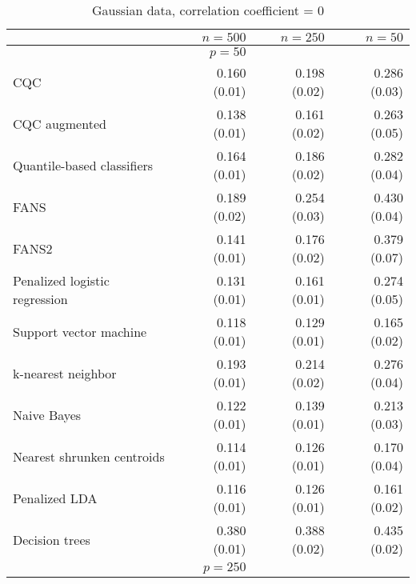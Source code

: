 

\begin{table}[p]
  \centering
  \caption{Gaussian data, correlation coefficient = 0}
  \label{tab:gauss-corr0}
  \vspace{5mm}
  
  \begin{adjustbox}{max size={\textwidth}{10cm}}
    \begin{tabular}{l@{\extracolsep{15mm}}rrr}
      
      \hline
      & $n=500$ & $n=250$ & $n=50$ \\ 
      \hline
      & $p = 50$ \\
      \hline

      CQC & 0.160 (0.01) & 0.198 (0.02) & 0.286 (0.03) \\ 
      CQC augmented & 0.138 (0.01) & 0.161 (0.02) & 0.263 (0.05) \\
      Quantile-based classifiers & 0.164 (0.01) & 0.186 (0.02) & 0.282 (0.04) \\
      FANS  & 0.189 (0.02) & 0.254 (0.03) & 0.430 (0.04) \\
      FANS2 & 0.141 (0.01) & 0.176 (0.02) & 0.379 (0.07) \\
      Penalized logistic regression & 0.131 (0.01) & 0.161 (0.01) & 0.274 (0.05) \\ 
      Support vector machine & 0.118 (0.01) & 0.129 (0.01) & 0.165 (0.02) \\ 
      k-nearest neighbor & 0.193 (0.01) & 0.214 (0.02) & 0.276 (0.04) \\ 
      Naive Bayes & 0.122 (0.01) & 0.139 (0.01) & 0.213 (0.03) \\ 
      Nearest shrunken centroids & 0.114 (0.01) & 0.126 (0.01) & 0.170 (0.04) \\ 
      Penalized LDA & 0.116 (0.01) & 0.126 (0.01) & 0.161 (0.02) \\ 
      Decision trees & 0.380 (0.01) & 0.388 (0.02) & 0.435 (0.02) \\ [2ex]

      \hline
      & $p = 250$ \\
      \hline


\end{tabular}
\end{adjustbox}
\end{table}

